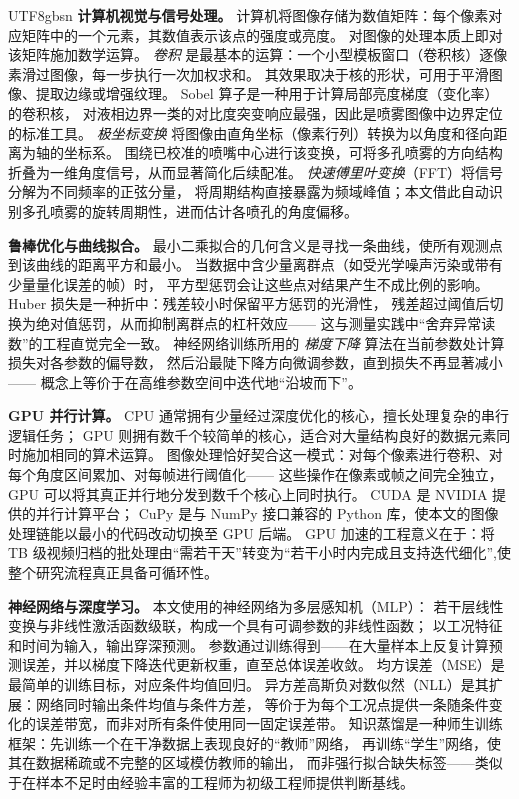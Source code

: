\documentclass[english, 12pt, a4paper, elec, utf8, a-2b, online]{aaltothesis}
\begin{document}
\begin{CJK*}{UTF8}{gbsn}
\textbf{计算机视觉与信号处理。}
计算机将图像存储为数值矩阵：每个像素对应矩阵中的一个元素，其数值表示该点的强度或亮度。
对图像的处理本质上即对该矩阵施加数学运算。
\emph{卷积} 是最基本的运算：一个小型模板窗口（卷积核）逐像素滑过图像，每一步执行一次加权求和。
其效果取决于核的形状，可用于平滑图像、提取边缘或增强纹理。
Sobel 算子是一种用于计算局部亮度梯度（变化率）的卷积核，
对液相边界一类的对比度突变响应最强，因此是喷雾图像中边界定位的标准工具。
\emph{极坐标变换} 将图像由直角坐标（像素行列）转换为以角度和径向距离为轴的坐标系。
围绕已校准的喷嘴中心进行该变换，可将多孔喷雾的方向结构折叠为一维角度信号，从而显著简化后续配准。
\emph{快速傅里叶变换}（FFT）将信号分解为不同频率的正弦分量，
将周期结构直接暴露为频域峰值；本文借此自动识别多孔喷雾的旋转周期性，进而估计各喷孔的角度偏移。

\textbf{鲁棒优化与曲线拟合。}
最小二乘拟合的几何含义是寻找一条曲线，使所有观测点到该曲线的距离平方和最小。
当数据中含少量离群点（如受光学噪声污染或带有少量量化误差的帧）时，
平方型惩罚会让这些点对结果产生不成比例的影响。
Huber 损失是一种折中：残差较小时保留平方惩罚的光滑性，
残差超过阈值后切换为绝对值惩罚，从而抑制离群点的杠杆效应——
这与测量实践中``舍弃异常读数''的工程直觉完全一致。
神经网络训练所用的 \emph{梯度下降} 算法在当前参数处计算损失对各参数的偏导数，
然后沿最陡下降方向微调参数，直到损失不再显著减小——
概念上等价于在高维参数空间中迭代地``沿坡而下''。

\textbf{GPU 并行计算。}
CPU 通常拥有少量经过深度优化的核心，擅长处理复杂的串行逻辑任务；
GPU 则拥有数千个较简单的核心，适合对大量结构良好的数据元素同时施加相同的算术运算。
图像处理恰好契合这一模式：对每个像素进行卷积、对每个角度区间累加、对每帧进行阈值化——
这些操作在像素或帧之间完全独立，GPU 可以将其真正并行地分发到数千个核心上同时执行。
CUDA 是 NVIDIA 提供的并行计算平台；
CuPy 是与 NumPy 接口兼容的 Python 库，使本文的图像处理链能以最小的代码改动切换至 GPU 后端。
GPU 加速的工程意义在于：将 TB 级视频归档的批处理由``需若干天''转变为``若干小时内完成且支持迭代细化'',使整个研究流程真正具备可循环性。

\textbf{神经网络与深度学习。}
本文使用的神经网络为多层感知机（MLP）：
若干层线性变换与非线性激活函数级联，构成一个具有可调参数的非线性函数；
以工况特征和时间为输入，输出穿深预测。
参数通过训练得到——在大量样本上反复计算预测误差，并以梯度下降迭代更新权重，直至总体误差收敛。
均方误差（MSE）是最简单的训练目标，对应条件均值回归。
异方差高斯负对数似然（NLL）是其扩展：网络同时输出条件均值与条件方差，
等价于为每个工况点提供一条随条件变化的误差带宽，而非对所有条件使用同一固定误差带。
知识蒸馏是一种师生训练框架：先训练一个在干净数据上表现良好的``教师''网络，
再训练``学生''网络，使其在数据稀疏或不完整的区域模仿教师的输出，
而非强行拟合缺失标签——类似于在样本不足时由经验丰富的工程师为初级工程师提供判断基线。


\end{CJK*}
\end{document}
